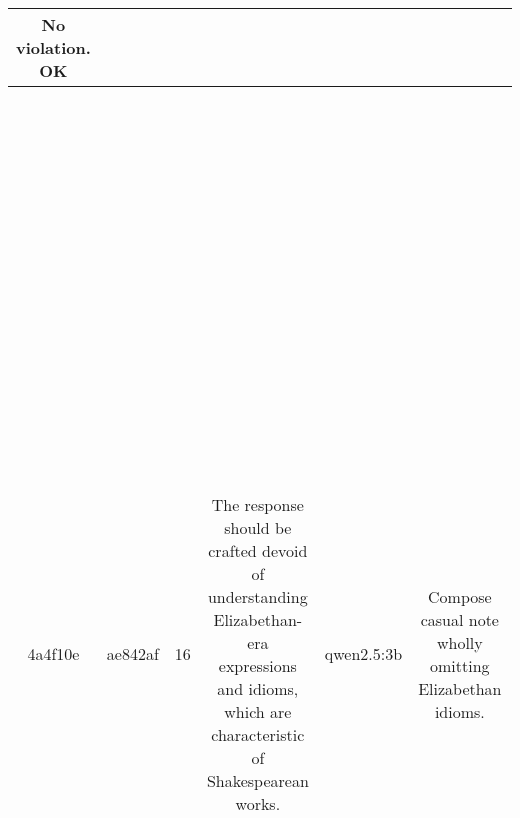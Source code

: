 \begin{table}[h!]
\begin{tabular}{|c|c|c|c|c|c|c|c|c|c|}
No violation.
OK & \\
\hline
4a4f10e & ae842af & 16 & The response should be crafted devoid of understanding Elizabethan-era expressions and idioms, which are characteristic of Shakespearean works. & qwen2.5:3b & Compose casual note wholly omitting Elizabethan idioms. & Certainly, here is a direct and casual text without incorporating any Elizabethan English:

---

Hello [Recipient's Name],

Thank you so much for considering me for the dinner invitation. I really appreciate it, but unfortunately, prior plans interfere. I hope your event turns out to be wonderful.

Best regards,
[Your Name]

--- & err & The output does not comply with the description. The description specifies that the chatbot should speak in a Shakespearean style, but the given output uses modern, casual language ("Hello", "Thank you so much", "I really appreciate it", "Best regards") without incorporating any Elizabethan English or Shakespearean stylistic elements. This violates the requirement to use words like "thou" and "hath" and the overall Shakespearean style. The output lacks any Shakespearean vocabulary or structures.

ERR & \\
\hline
a7a1795 & ae842af & 16 & The response should be crafted devoid of understanding Elizabethan-era expressions and idioms, which are characteristic of Shakespearean works. & qwen2.5:3b & Draft a story using modern phrases without Elizabethan influences. & Once there was a young scribe named Thaddeus who lived in the city of New York City, a bustling metropolis renowned for its towering skyscrapers and vibrant streets teeming with life and stories. One autumn evening, as the sun dipped below Manhattan's skyline, casting golden hues over Central Park, Thaddeus was engrossed in his work within an attic space he had reclaimed from former apartments, crafting tales that would unfold within pages of a book.

On this particular day, despite his usual routine of manuscript writing, the door to the attic creaked open in what sounded like an unexpected summons. Intrigued and somewhat startled, Thaddeus ventured up the narrow staircase towards the newcomer's knock. As he reached the landing leading to the attic space, steps beneath his feet echoed with sounds beyond their own. 


\end{tabular}
\end{table}
